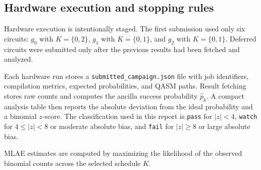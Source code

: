 \subsection{Hardware execution and stopping rules}

Hardware execution is intentionally staged. The first submission used only six
circuits: \(g_0\) with \(K=\{0,2\}\), \(g_1\) with \(K=\{0,1\}\), and \(g_2\)
with \(K=\{0,1\}\). Deferred circuits were submitted only after the previous
results had been fetched and analyzed.

Each hardware run stores a \texttt{submitted\_campaign.json} file with job
identifiers, compilation metrics, expected probabilities, and QASM paths. Result
fetching stores raw counts and computes the ancilla success probability
\(\hat{p}_k\). A compact analysis table then reports the absolute deviation from
the ideal probability and a binomial \(z\)-score. The classification used in
this report is \texttt{pass} for \(|z|<4\), \texttt{watch} for
\(4\le |z|<8\) or moderate absolute bias, and \texttt{fail} for \(|z|\ge 8\)
or large absolute bias.

MLAE estimates are computed by maximizing the likelihood of the observed
binomial counts across the selected schedule \(K\).
